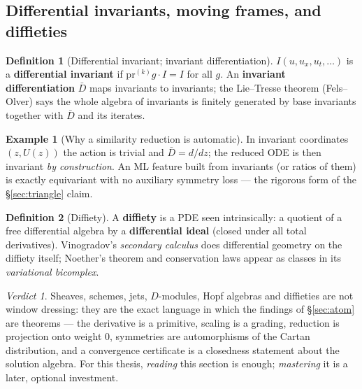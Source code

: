 \documentclass[11pt]{article}
\theoremstyle{definition}
\newtheorem{definition}{Definition}[section]
\newtheorem{example}{Example}[section]
\theoremstyle{remark}
\newtheorem*{verdict}{Verdict}
\begin{document}
\subsection{Differential invariants, moving frames, and diffieties}

\begin{definition}[Differential invariant; invariant differentiation]
$I(u,u_x,u_t,\dots)$ is a \textbf{differential invariant} if $\mathrm{pr}^{(k)}g\cdot I=I$ for all $g$.
An \textbf{invariant differentiation} $\bar D$ maps invariants to invariants; the Lie--Tresse theorem
(Fels--Olver) says the whole algebra of invariants is finitely generated by base invariants together
with $\bar D$ and its iterates.
\end{definition}

\begin{example}[Why a similarity reduction is automatic]
In invariant coordinates $(z,U(z))$ the action is trivial and $\bar D=d/dz$; the reduced ODE is then
invariant \emph{by construction}. An ML feature built from invariants (or ratios of them) is exactly
equivariant with no auxiliary symmetry loss --- the rigorous form of the \S\ref{sec:triangle} claim.
\end{example}

\begin{definition}[Diffiety]
A \textbf{diffiety} is a PDE seen intrinsically: a quotient of a free differential algebra by a
\textbf{differential ideal} (closed under all total derivatives). Vinogradov's \emph{secondary
calculus} does differential geometry on the diffiety itself; Noether's theorem and conservation laws
appear as classes in its \emph{variational bicomplex}.
\end{definition}

\begin{verdict}
Sheaves, schemes, jets, $D$-modules, Hopf algebras and diffieties are not window dressing: they are the
exact language in which the findings of \S\ref{sec:atom} are theorems --- the derivative is a primitive,
scaling is a grading, reduction is projection onto weight $0$, symmetries are automorphisms of the
Cartan distribution, and a convergence certificate is a closedness statement about the solution algebra.
For this thesis, \emph{reading} this section is enough; \emph{mastering} it is a later, optional
investment.
\end{verdict}
\end{document}
